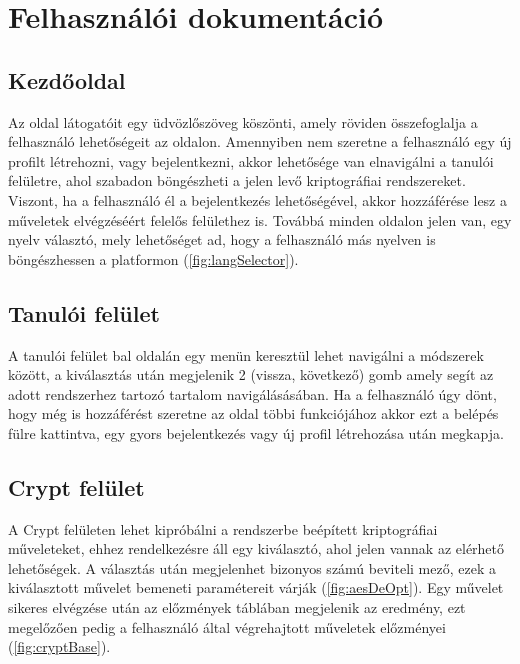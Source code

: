 \chapter{Felhasználói dokumentáció}

\section{Kezdőoldal}
Az oldal látogatóit egy üdvözlőszöveg köszönti, amely röviden összefoglalja a felhasználó lehetőségeit az oldalon.
Amennyiben nem szeretne a felhasználó egy új profilt létrehozni, vagy bejelentkezni, akkor lehetősége van elnavigálni a tanulói felületre, ahol szabadon böngészheti a jelen levő kriptográfiai rendszereket.
Viszont, ha a felhasználó él a bejelentkezés lehetőségével, akkor hozzáférése lesz a műveletek elvégzéséért felelős felülethez is.
Továbbá minden oldalon jelen van, egy nyelv választó, mely lehetőséget ad, hogy a felhasználó más nyelven is böngészhessen a platformon (\ref{fig:langSelector}).


\section{Tanulói felület}
A tanulói felület bal oldalán egy menün keresztül lehet navigálni a módszerek között, a kiválasztás után megjelenik 2 (vissza, következő) gomb amely segít az adott rendszerhez tartozó tartalom navigálásásában.
Ha a felhasználó úgy dönt, hogy még is hozzáférést szeretne az oldal többi funkciójához akkor ezt a belépés fülre kattintva, egy gyors bejelentkezés vagy új profil létrehozása után megkapja.



\section{Crypt felület}
A Crypt felületen lehet kipróbálni a rendszerbe beépített kriptográfiai műveleteket, ehhez rendelkezésre áll egy kiválasztó, ahol jelen vannak az elérhető lehetőségek. A választás után megjelenhet bizonyos számú beviteli mező, ezek a kiválasztott művelet bemeneti paramétereit várják (\ref{fig:aesDeOpt}).
Egy művelet sikeres elvégzése után az előzmények táblában megjelenik az eredmény, ezt megelőzően pedig a felhasználó által végrehajtott műveletek előzményei (\ref{fig:cryptBase}).


